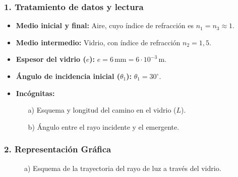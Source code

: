 \subsubsection*{1. Tratamiento de datos y lectura}
\begin{itemize}
    \item \textbf{Medio inicial y final:} Aire, cuyo índice de refracción es $n_1 = n_3 \approx 1$.
    \item \textbf{Medio intermedio:} Vidrio, con índice de refracción $n_2 = 1,5$.
    \item \textbf{Espesor del vidrio ($e$):} $e = 6\,\text{mm} = 6 \cdot 10^{-3}\,\text{m}$.
    \item \textbf{Ángulo de incidencia inicial ($\theta_1$):} $\theta_1 = 30^\circ$.
    \item \textbf{Incógnitas:}
        \begin{itemize}
            \item[a)] Esquema y longitud del camino en el vidrio ($L$).
            \item[b)] Ángulo entre el rayo incidente y el emergente.
        \end{itemize}
\end{itemize}

\subsubsection*{2. Representación Gráfica}
\begin{figure}[H]
    \centering
    \caption{a) Esquema de la trayectoria del rayo de luz a través del vidrio.}
\end{figure}

